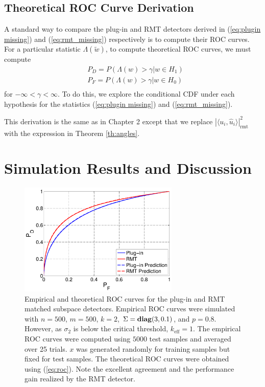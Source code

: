 \subsection{Theoretical ROC Curve Derivation}\label{sec:roc_missing}
A standard way to compare the plug-in and RMT detectors derived in (\ref{eq:plugin missing}) and (\ref{eq:rmt_missing}) respectively is to compute their ROC curves. For a particular statistic $\Lambda(\widetilde{w})$, to compute theoretical ROC curves, we must compute
\begin{equation}\label{eq:target cdf}
\begin{aligned}
&P_D = P(\Lambda(w) > \gamma| w\in H_1)\\
&P_F = P(\Lambda(w) > \gamma| w\in H_0)\\
\end{aligned}
\end{equation}
for $-\infty<\gamma<\infty$. To do this, we explore the conditional CDF under each hypothesis for the statistics (\ref{eq:plugin missing}) and (\ref{eq:rmt_missing}).

This derivation is the same as in Chapter 2 except that we replace $|\langle
u_i,\widehat{u}_i\rangle|_{\text{rmt}}^2$ with the expression in Theorem \ref{th:angles}. 

\section{Simulation Results and Discussion}\label{sec:results}

\begin{figure}[t]
\centering
\includegraphics[width=3in]{msd_missing/figures/basic_roc.pdf}
\caption{Empirical and theoretical ROC curves for the plug-in and RMT matched subspace detectors. Empirical ROC curves were simulated with $n=500$, $m=500$, $k=2$, $\Sigma=\mathop{\bf diag}(3,0.1)$, and $p=0.8$. However, as $\sigma_2$ is below the critical threshold, $k_{\text{eff}} = 1$. The empirical ROC curves were computed using $5000$ test samples and averaged over 25 trials. $x$ was generated randomly for training samples but fixed for test samples. The theoretical ROC curves were obtained using (\ref{eq:roc}). Note the excellent agreement and the performance gain realized by the RMT detector.}\vskip-0.45cm
\label{fig:roc1}
\end{figure}


